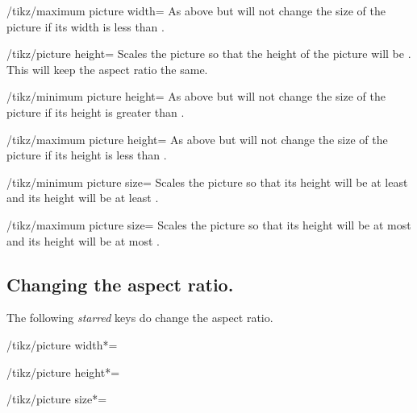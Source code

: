 \begin{multicols}{2}
\begin{key}{/tikz/maximum picture width=}
  As above but will not change the size of the picture
  if its width is less than .
\end{key}

\begin{key}{/tikz/picture height=}
  Scales the picture so that the height of the picture will be .
  This will keep the aspect ratio the same.
\end{key}

\begin{key}{/tikz/minimum picture height=}
  As above but will not change the size of the picture
  if its height is greater than .
\end{key}

\begin{key}{/tikz/maximum picture height=}
  As above but will not change the size of the picture
  if its height is less than .
\end{key}

\begin{key}{/tikz/minimum picture size=}
  Scales the picture so that its height will be at least 
  and its height will be at least .
\end{key}

\begin{key}{/tikz/maximum picture size=}
  Scales the picture so that its height will be at most 
  and its height will be at most .
\end{key}

\subsection{Changing the aspect ratio.}
The following \emph{starred} keys do change the aspect ratio.
\begin{key}{/tikz/picture width*=}
\end{key}

\begin{key}{/tikz/picture height*=}
\end{key}

\begin{key}{/tikz/picture size*=}
\end{key}
\end{multicols}
